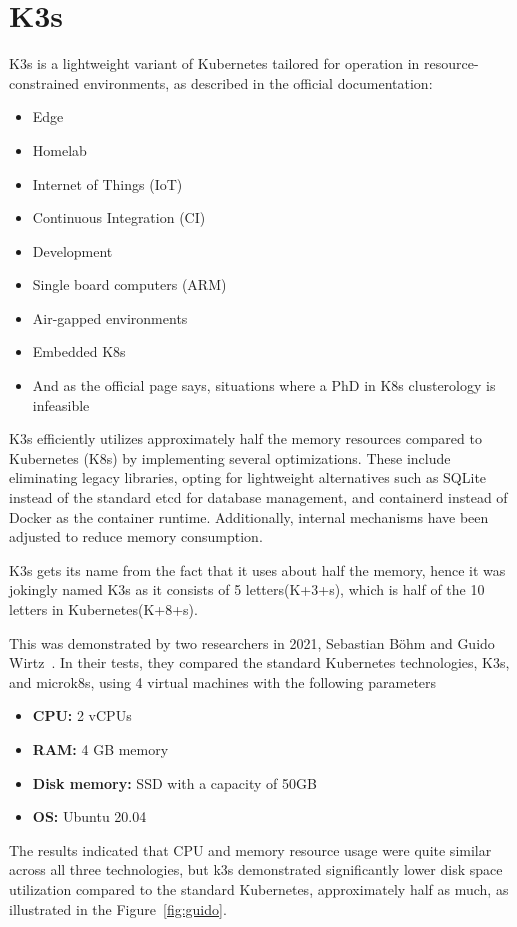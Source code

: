 \section{K3s}
K3s is a lightweight variant of Kubernetes tailored for operation in resource-constrained environments,  as described in the official documentation\cite{k2-1}:
\begin{itemize}
\item Edge
\item Homelab
\item Internet of Things (IoT)
\item Continuous Integration (CI)
\item Development
\item Single board computers (ARM)
\item Air-gapped environments
\item Embedded K8s
\item And as the official page says, situations where a PhD in K8s clusterology is infeasible
\end{itemize}
K3s efficiently utilizes approximately half the memory resources compared to Kubernetes (K8s) by implementing several optimizations. These include eliminating legacy libraries, opting for lightweight alternatives such as SQLite instead of the standard etcd for database management, and containerd instead of Docker as the container runtime. Additionally, internal mechanisms have been adjusted to reduce memory consumption.

K3s gets its name from the fact that it uses about half the memory, hence it was jokingly named K3s as it consists of 5 letters(K+3+s), which is half of the 10 letters in Kubernetes(K+8+s).

This was demonstrated by two researchers in 2021, Sebastian Böhm and Guido Wirtz~\cite{k2-1}. In their tests, they compared the standard Kubernetes technologies, K3s, and microk8s, using 4 virtual machines with the following parameters

\begin{itemize}
\item \textbf{CPU:} 2 vCPUs
\item \textbf{RAM:} 4 GB memory
\item \textbf{Disk memory:} SSD with a capacity of 50GB
\item \textbf{OS:} Ubuntu 20.04
\end{itemize}

The results indicated that CPU and memory resource usage were quite similar across all three technologies, but k3s demonstrated significantly lower disk space utilization compared to the standard Kubernetes, approximately half as much, as illustrated in the Figure~\ref{fig:guido}.

